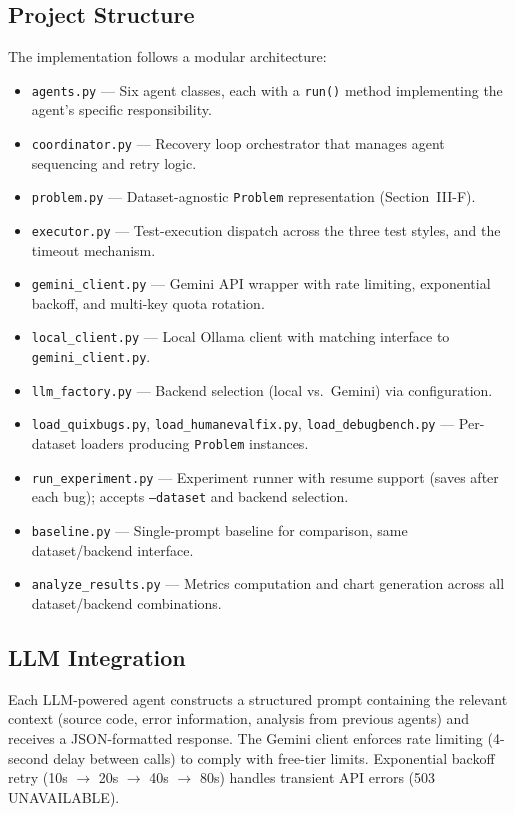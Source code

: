\documentclass[conference]{IEEEtran}
\begin{document}
\subsection{Project Structure}
The implementation follows a modular architecture:
\begin{itemize}
    \item \texttt{agents.py} --- Six agent classes, each with a \texttt{run()} method implementing the agent's specific responsibility.
    \item \texttt{coordinator.py} --- Recovery loop orchestrator that manages agent sequencing and retry logic.
    \item \texttt{problem.py} --- Dataset-agnostic \texttt{Problem} representation (Section~III-F).
    \item \texttt{executor.py} --- Test-execution dispatch across the three test styles, and the timeout mechanism.
    \item \texttt{gemini\_client.py} --- Gemini API wrapper with rate limiting, exponential backoff, and multi-key quota rotation.
    \item \texttt{local\_client.py} --- Local Ollama client with matching interface to \texttt{gemini\_client.py}.
    \item \texttt{llm\_factory.py} --- Backend selection (local vs.\ Gemini) via configuration.
    \item \texttt{load\_quixbugs.py}, \texttt{load\_humanevalfix.py}, \texttt{load\_debugbench.py} --- Per-dataset loaders producing \texttt{Problem} instances.
    \item \texttt{run\_experiment.py} --- Experiment runner with resume support (saves after each bug); accepts \texttt{--dataset} and backend selection.
    \item \texttt{baseline.py} --- Single-prompt baseline for comparison, same dataset/backend interface.
    \item \texttt{analyze\_results.py} --- Metrics computation and chart generation across all dataset/backend combinations.
\end{itemize}

\subsection{LLM Integration}
Each LLM-powered agent constructs a structured prompt containing the relevant context (source code, error information, analysis from previous agents) and receives a JSON-formatted response. The Gemini client enforces rate limiting (4-second delay between calls) to comply with free-tier limits. Exponential backoff retry (10s $\rightarrow$ 20s $\rightarrow$ 40s $\rightarrow$ 80s) handles transient API errors (503 UNAVAILABLE).
\end{document}
